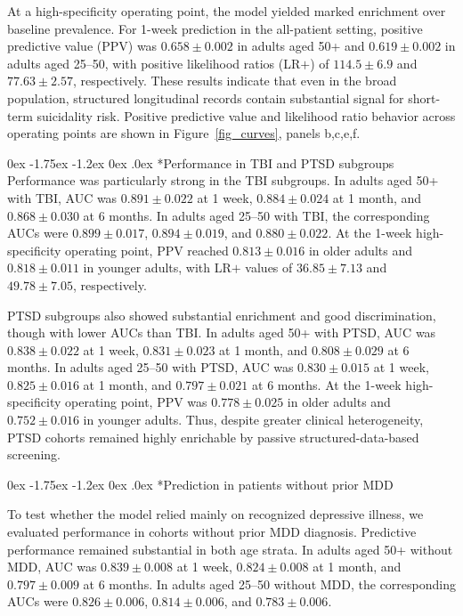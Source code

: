 \documentclass[onecolumn, compsoc,11pt]{IEEEtran}
\makeatletter
\renewcommand\subsection{\@startsection {subsection}{2}{\z@}
  {0ex \@plus -1.75ex \@minus -1.2ex}
  {0ex \@plus.0ex}
  {\fontsize{11}{11}\selectfont\bfseries\sffamily}}
\makeatother
\begin{document}
At a high-specificity operating point, the model yielded marked enrichment over baseline prevalence. For 1-week prediction in the all-patient setting, positive predictive value (PPV) was $0.658 \pm 0.002$ in adults aged 50+ and $0.619 \pm 0.002$ in adults aged 25--50, with positive likelihood ratios (LR$+$) of $114.5 \pm 6.9$ and $77.63 \pm 2.57$, respectively. These results indicate that even in the broad population, structured longitudinal records contain substantial signal for short-term suicidality risk.
Positive predictive value and likelihood ratio behavior across operating points are shown in Figure~\ref{fig_curves}, panels b,c,e,f.

\subsection*{Performance in TBI and PTSD subgroups}
Performance was particularly strong in the TBI subgroups. In adults aged 50+ with TBI, AUC was $0.891 \pm 0.022$ at 1 week, $0.884 \pm 0.024$ at 1 month, and $0.868 \pm 0.030$ at 6 months. In adults aged 25--50 with TBI, the corresponding AUCs were $0.899 \pm 0.017$, $0.894 \pm 0.019$, and $0.880 \pm 0.022$. At the 1-week high-specificity operating point, PPV reached $0.813 \pm 0.016$ in older adults and $0.818 \pm 0.011$ in younger adults, with LR$+$ values of $36.85 \pm 7.13$ and $49.78 \pm 7.05$, respectively.

PTSD subgroups also showed substantial enrichment and good discrimination, though with lower AUCs than TBI. In adults aged 50+ with PTSD, AUC was $0.838 \pm 0.022$ at 1 week, $0.831 \pm 0.023$ at 1 month, and $0.808 \pm 0.029$ at 6 months. In adults aged 25--50 with PTSD, AUC was $0.830 \pm 0.015$ at 1 week, $0.825 \pm 0.016$ at 1 month, and $0.797 \pm 0.021$ at 6 months. At the 1-week high-specificity operating point, PPV was $0.778 \pm 0.025$ in older adults and $0.752 \pm 0.016$ in younger adults. Thus, despite greater clinical heterogeneity, PTSD cohorts remained highly enrichable by passive structured-data-based screening.

\subsection*{Prediction in patients without prior MDD}

To test whether the model relied mainly on recognized depressive illness, we evaluated performance in cohorts without prior MDD diagnosis. Predictive performance remained substantial in both age strata. In adults aged 50+ without MDD, AUC was $0.839 \pm 0.008$ at 1 week, $0.824 \pm 0.008$ at 1 month, and $0.797 \pm 0.009$ at 6 months. In adults aged 25--50 without MDD, the corresponding AUCs were $0.826 \pm 0.006$, $0.814 \pm 0.006$, and $0.783 \pm 0.006$.
\end{document}
